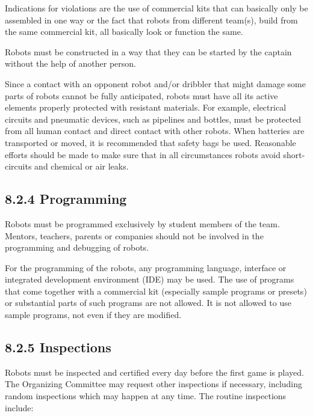\documentclass{article}
\begin{document}
Indications for violations are the use of commercial kits that can basically only be assembled in one way or the fact that robots from different team(s), build from the same commercial kit, all basically look or function the same.

Robots must be constructed in a way that they can be started by the captain without the help of another person. 

Since a contact with an opponent robot and/or dribbler that might damage some parts of robots cannot be fully anticipated, robots must have all its active elements properly protected with resistant materials. For example, electrical circuits and pneumatic devices, such as pipelines and bottles, must be protected from all human contact and direct contact with other robots. When batteries are transported or moved, it is recommended that safety bags be used. Reasonable efforts should be made to make sure that in all circumstances robots avoid short-circuits and chemical or air leaks. 

\subsection{8.2.4 Programming \label{ref-058}}

Robots must be programmed exclusively by student members of the team. Mentors, teachers, parents or companies should not be involved in the programming and debugging of robots. 

For the programming of the robots, any programming language, interface or integrated development environment (IDE) may be used. The use of programs that come together with a commercial kit (especially sample programs or presets) or substantial parts of such programs are not allowed. It is not allowed to use sample programs, not even if they are modified. 

\subsection{8.2.5 Inspections \label{ref-059}}

Robots must be inspected and certified every day before the first game is played. The Organizing Committee may request other inspections if necessary, \textcolor{color-5}{including random inspections which may happen at any time}. The routine inspections include:
\end{document}
